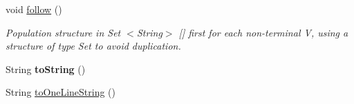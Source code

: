 \begin{DoxyCompactItemize}
void \hyperlink{classcontext_free_1_1grammar_1_1_context_free_grammar_aca5cad8fa908f908d38e0e7e0aa181ed}{follow} ()
\begin{DoxyCompactList}\small\item\em Population structure in Set $<$\-String$>$ \mbox{[}\mbox{]} first for each non-\/terminal V, using a structure of type Set to avoid duplication. \end{DoxyCompactList}\item 
\hypertarget{classcontext_free_1_1grammar_1_1_context_free_grammar_afd242bd888b53c20465c0bd3675d29d4}{String {\bfseries to\-String} ()}\label{classcontext_free_1_1grammar_1_1_context_free_grammar_afd242bd888b53c20465c0bd3675d29d4}

\item 
String \hyperlink{classcontext_free_1_1grammar_1_1_context_free_grammar_a922203e2db862d2a8ab31e8e7736273b}{to\-One\-Line\-String} ()
\end{DoxyCompactItemize}
